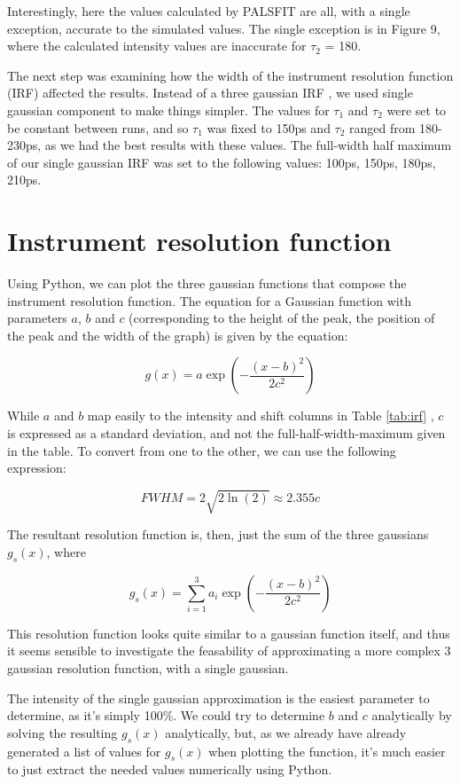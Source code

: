 Interestingly, here the values calculated by PALSFIT are all, with a single exception, accurate to the simulated values. The single exception is in Figure 9, where the calculated intensity values are inaccurate for $\tau_2$ = 180.

The next step was examining how the width of the instrument resolution function (IRF) affected the results. Instead of a three gaussian IRF ,  we used single gaussian component to make things simpler. The values for $\tau_1$ and $\tau_2$ were set to be constant between runs, and so $\tau_1$ was fixed to 150ps and $\tau_2$ ranged from 180-230ps, as we had the best results with these values. The full-width half maximum of our single gaussian IRF was set to the following values: 100ps, 150ps, 180ps, 210ps.

\section{Instrument resolution function}

Using Python, we can plot the three gaussian functions that compose the instrument resolution function. The equation for a Gaussian function with parameters $a$, $b$ and $c$ (corresponding to the height of the peak, the position of the peak and the width of the graph) is given by the equation:

\[g(x) = a\exp{\left(-\frac{(x-b)^2}{2c^2}\right)} \]

While $a$ and $b$ map easily to the intensity and shift columns in Table \ref{tab:irf} ,  $c$ is expressed as a standard deviation, and not the full-half-width-maximum given in the table. To convert from one to the other, we can use the following expression:

\[ FWHM = 2\sqrt{2\ln(2)} \approx 2.355c \]

The resultant resolution function is, then, just the sum of the three gaussians $g_s(x)$, where

\[g_s(x) = \sum_{i=1}^{3}{a_i \exp{\left(-\frac{(x-b)^2}{2c^2}\right)}}\]

This resolution function looks quite similar to a gaussian function itself, and thus it seems sensible to investigate the feasability of approximating a more complex 3 gaussian resolution function, with a single gaussian.

The intensity of the single gaussian approximation is the easiest parameter to determine, as it's simply 100\%. We could try to determine $b$ and $c$ analytically by solving the resulting $g_s(x)$ analytically, but, as we already have already generated a list of values for $g_s(x)$ when plotting the function, it's much easier to just extract the needed values numerically using Python.

